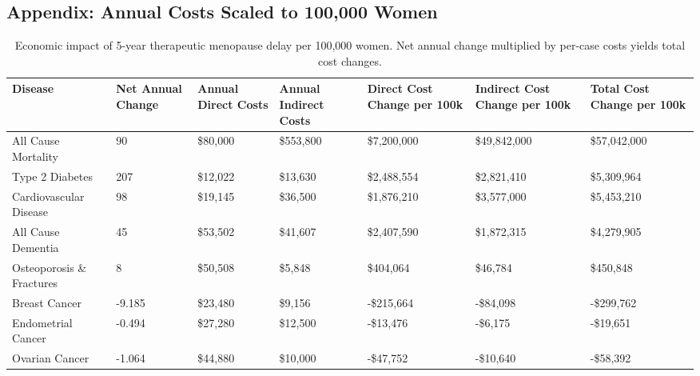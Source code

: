 \documentclass[12pt]{article}
\begin{document}
\begin{landscape}
\section*{Appendix: Annual Costs Scaled to 100,000 Women}
\begin{table}[h]
\centering
\small
\begin{tabular}{|p{3cm}|p{1.6cm}|p{1.8cm}|p{1.8cm}|p{2.4cm}|p{2.4cm}|p{2.4cm}|}
\hline
\textbf{Disease} & \textbf{Net Annual Change} & \textbf{Annual Direct Costs} & \textbf{Annual Indirect Costs} & \textbf{Direct Cost Change per 100k} & \textbf{Indirect Cost Change per 100k} & \textbf{Total Cost Change per 100k} \\
\hline
All Cause Mortality & 90 & \$80,000 & \$553,800 & \$7,200,000 & \$49,842,000 & \$57,042,000 \\
\hline
Type 2 Diabetes & 207 & \$12,022 & \$13,630 & \$2,488,554 & \$2,821,410 & \$5,309,964 \\
\hline
Cardiovascular Disease & 98 & \$19,145 & \$36,500 & \$1,876,210 & \$3,577,000 & \$5,453,210 \\
\hline
All Cause Dementia & 45 & \$53,502 & \$41,607 & \$2,407,590 & \$1,872,315 & \$4,279,905 \\
\hline
Osteoporosis \& Fractures & 8 & \$50,508 & \$5,848 & \$404,064 & \$46,784 & \$450,848 \\
\hline
Breast Cancer & -9.185 & \$23,480 & \$9,156 & -\$215,664 & -\$84,098 & -\$299,762 \\
\hline
Endometrial Cancer & -0.494 & \$27,280 & \$12,500 & -\$13,476 & -\$6,175 & -\$19,651 \\
\hline
Ovarian Cancer & -1.064 & \$44,880 & \$10,000 & -\$47,752 & -\$10,640 & -\$58,392 \\
\hline
\end{tabular}
\caption{Economic impact of 5-year therapeutic menopause delay per 100,000 women. Net annual change multiplied by per-case costs yields total cost changes.}
\label{tab:scaled_costs}
\end{table}
\end{landscape}
\end{document}
